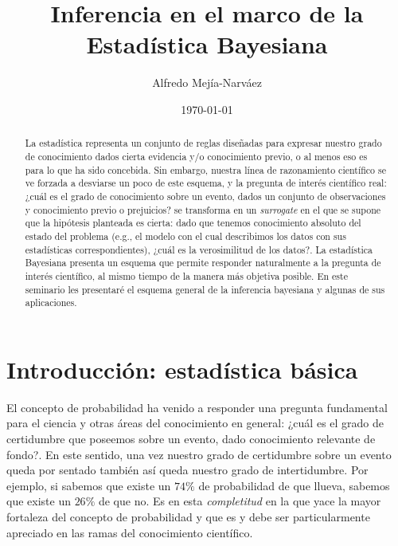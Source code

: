 \documentclass[a4paper,twoside]{article}
\title{Inferencia en el marco de la Estadística Bayesiana}
\author{Alfredo Mejía-Narváez}
\date{\today}
\begin{document}
\maketitle

\begin{abstract}
%
La estadística representa un conjunto de reglas diseñadas para expresar nuestro grado de
conocimiento dados cierta evidencia y/o conocimiento previo, o al menos eso es para lo que ha sido
concebida. Sin embargo, nuestra línea de razonamiento científico se ve forzada a desviarse un poco
de este esquema, y la pregunta de interés científico real: ¿cuál es el grado de conocimiento sobre
un evento, dados un conjunto de observaciones y conocimiento previo o prejuicios? se transforma en
un \emph{surrogate} en el que se supone que la hipótesis planteada es cierta: dado que tenemos
conocimiento absoluto del estado del problema (e.g., el modelo con el cual describimos los datos con
sus estadísticas correspondientes), ¿cuál es la verosimilitud de los datos?. La estadística
Bayesiana presenta un esquema que permite responder naturalmente a la pregunta de interés
científico, al mismo tiempo de la manera más objetiva posible. En este seminario les presentaré el
esquema general de la inferencia bayesiana y algunas de sus aplicaciones.
%
\end{abstract}


\section{Introducción: estadística básica}

El concepto de probabilidad ha venido a responder una pregunta fundamental para el ciencia y otras
áreas del conocimiento en general: ¿cuál es el grado de certidumbre que poseemos sobre un evento,
dado conocimiento relevante de fondo?. En este sentido, una vez nuestro grado de certidumbre sobre
un evento queda por sentado también así queda nuestro grado de intertidumbre. Por ejemplo, si
sabemos que existe un $74\%$ de probabilidad de que llueva, sabemos que existe un $26\%$ de que
no. Es en esta \emph{completitud} en la que yace la mayor fortaleza del concepto de probabilidad y
que es y debe ser particularmente apreciado en las ramas del conocimiento científico.
\end{document}

